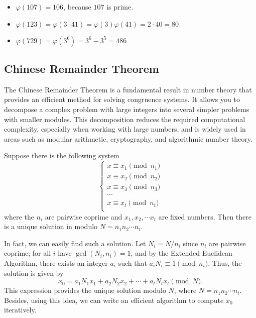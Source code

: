 \documentclass[../lecture-notes-148x210.tex]{subfiles}
\begin{document}
\begin{example}
    \hfill

    \begin{itemize}
        \item $\varphi(107) = 106$, because $107$ is prime.
        \item $\varphi(123) = \varphi(3 \cdot 41) = \varphi(3)\varphi(41) = 2 \cdot 40 = 80$
        \item $\varphi(729) = \varphi(3^6) = 3^6 - 3^5 = 486$
    \end{itemize}
\end{example}

\subsection{Chinese Remainder Theorem}
The Chinese Remainder Theorem \cite[chapter 10]{Cohen_Frey_2005} is a fundamental result in number theory
that provides an efficient method for solving congruence systems. It allows you to
decompose a complex problem with large integers into several simpler 
problems with smaller modules. This decomposition reduces the required computational 
complexity, especially when working with large numbers, and is widely used 
in areas such as modular arithmetic, cryptography, and algorithmic number theory. 

\begin{theorem}  \label{th:chinese_remainder_theorem}
    Suppose there is the following system
    \begin{equation*}    
        \begin{cases}
            x \equiv x_1 \pmod{n_1} \\
            x \equiv x_2 \pmod{n_2} \\
            x \equiv x_3 \pmod{n_3} \\
            \cdots \\
            x \equiv x_t \pmod{n_t} \\
        \end{cases}
    \end{equation*}
    where the $n_i$ are pairwise coprime and $x_1, x_2, \cdots x_t$ are fixed numbers. 
    Then there is a unique solution in modulo $N = n_1n_2 \cdots n_t$.
\end{theorem}

In fact, we can easily find such a solution. Let $N_i = N/n_i$ since $n_i$ are pairwise coprime; 
for all $i$ have $\gcd(N_i, n_i) = 1$, and by the Extended Euclidean Algorithm, there exists an integer
$a_i$ such that $a_iN_i \equiv 1 \pmod{n_i}$. Thus, the solution is given by 
\begin{equation*}
    x_0 = a_1N_1x_1 + a_2N_2x_2 + \cdots + a_tN_tx_t \pmod{N}.
\end{equation*}
This expression provides the unique solution modulo $N$, where $N = n_1 n_2 \cdots n_t$. 
Besides, using this idea, we can write an efficient algorithm to compute $x_0$ iteratively.
\end{document}
